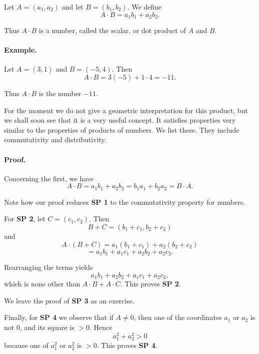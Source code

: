 \documentclass[12pt]{book} %
\begin{document}
\begin{ExerciseList}
Let $A=(a_1,a_2)$ and let $B=(b_1,b_2)$. We define
\[
A\cdot B=a_1b_1+a_2b_2.
\]

Thus $A\cdot B$ is a number, called the scalar, or dot product of $A$ and $B$.

\paragraph{Example.}
Let $A=(3,1)$ and $B=(-5,4)$. Then
\[
A\cdot B=3(-5)+1\cdot 4=-11.
\]

Thus $A\cdot B$ is the number $-11$.

For the moment we do not give a geometric interpretation for this product, but we shall soon see that it is a very useful concept. It satisfies properties very similar to the properties of products of numbers. We list these. They include commutativity and distributivity.


\paragraph{Proof.}
Concerning the first, we have
\[
A\cdot B=a_1b_1+a_2b_2=b_1a_1+b_2a_2=B\cdot A.
\]

Note how our proof reduces \textbf{SP 1} to the commutativity property for numbers.

For \textbf{SP 2}, let $C=(c_1,c_2)$. Then
\[
B+C=(b_1+c_1,b_2+c_2)
\]
and
\[
A\cdot(B+C)=a_1(b_1+c_1)+a_2(b_2+c_2)
\]
\[
= a_1b_1+a_1c_1+a_2b_2+a_2c_2.
\]

Rearranging the terms yields
\[
a_1b_1+a_2b_2+a_1c_1+a_2c_2,
\]
which is none other than $A\cdot B+A\cdot C$. This proves \textbf{SP 2}.

We leave the proof of \textbf{SP 3} as an exercise.

Finally, for \textbf{SP 4} we observe that if $A\ne 0$, then one of the coordinates $a_1$ or $a_2$ is not 0, and its square is $>0$. Hence
\[
a_1^2+a_2^2>0
\]
because one of $a_1^2$ or $a_2^2$ is $>0$. This proves \textbf{SP 4}.


\end{ExerciseList}
\end{document}

